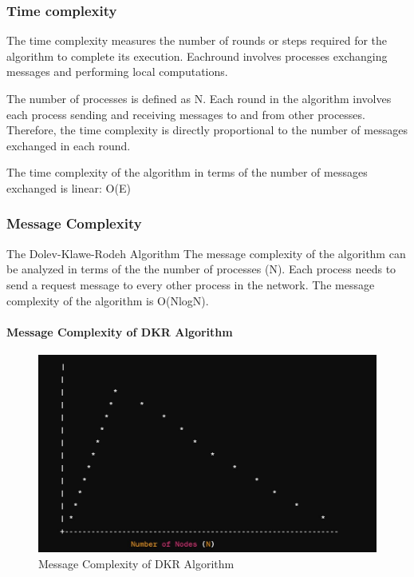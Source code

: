 \documentclass[11pt]{beamer}              %
\begin{document}
\begin{frame}
\frametitle{Time complexity}
The time complexity measures the number of rounds or steps required for the algorithm to complete its execution.
Eachround involves processes exchanging messages and performing local computations. 
\item The number of processes is defined as N. 
Each round in the algorithm involves each process sending and receiving messages
to and from other processes. 
Therefore, the time complexity is directly proportional to the number of messages exchanged in each round. 
\item The time complexity of the algorithm in terms of the number of messages exchanged is linear: O(E)
\end{frame}

\begin{frame}
\frametitle{Message Complexity}
The Dolev-Klawe-Rodeh Algorithm The message complexity of the algorithm can be analyzed in terms of the the number of processes (N). 
Each process needs to send a request message to every other process in the network. The message complexity of the algorithm is O(NlogN).

\end{frame}


\begin{frame}{}
\framesubtitle{Message Complexity of DKR Algorithm}

\begin{figure}
    \centering
    \includegraphics[scale=0.6]{figures/Screen19.jpg}
    \caption{Message Complexity of DKR Algorithm}
    \label{fig:Message Complexity}
\end{figure}
\note{
}
\end{frame}
\end{document}
